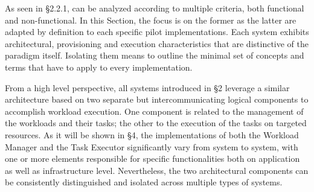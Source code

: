 \documentclass{sig-alternate}
\begin{document}
As seen in \S2.2.1, \pilotjobs can be analyzed according to multiple criteria,
both functional and non-functional. In this Section, the focus is on the former
as the latter are adapted by definition to each specific pilot implementations.
Each \pilotjob system exhibits architectural, provisioning and execution 
characteristics that are distinctive of the \pilotjob paradigm itself.
Isolating them means to outline the minimal set of concepts and terms that 
have to apply to every \pilotjob implementation.




%

From a high level perspective, all \pilotjob systems introduced in \S2 leverage
a similar architecture based on two separate but intercommunicating logical
components to accomplish workload execution. One component is related to the
management of the workloads and their tasks; the other to the execution of the
tasks on targeted resources. As it will be shown in \S4, the implementations of
both the Workload Manager and the Task Executor significantly vary from system
to system, with one or more elements responsible for specific functionalities
both on application as well as infrastructure level. Nevertheless, the two
architectural components can be consistently distinguished and isolated across 
multiple types of \pilotjob systems.
\end{document}
